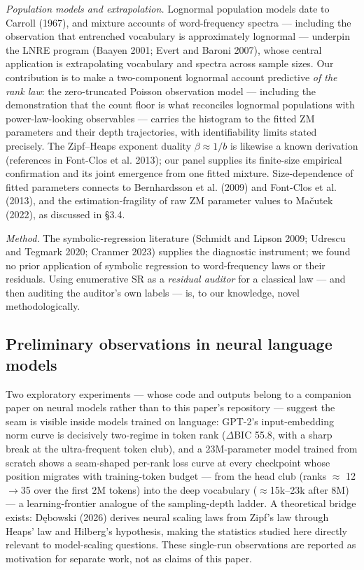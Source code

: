 \documentclass[11pt]{article}
\begin{document}
\emph{Population models and extrapolation.} Lognormal population models date to Carroll (1967), and mixture accounts of word-frequency spectra --- including the observation that entrenched vocabulary is approximately lognormal --- underpin the LNRE program (Baayen 2001; Evert and Baroni 2007), whose central application is extrapolating vocabulary and spectra across sample sizes. Our contribution is to make a two-component lognormal account predictive \emph{of the rank law}: the zero-truncated Poisson observation model --- including the demonstration that the count floor is what reconciles lognormal populations with power-law-looking observables --- carries the histogram to the fitted ZM parameters and their depth trajectories, with identifiability limits stated precisely. The Zipf--Heaps exponent duality $\beta \approx 1/b$ is likewise a known derivation (references in Font-Clos et al. 2013); our panel supplies its finite-size empirical confirmation and its joint emergence from one fitted mixture. Size-dependence of fitted parameters connects to Bernhardsson et al. (2009) and Font-Clos et al. (2013), and the estimation-fragility of raw ZM parameter values to Mačutek (2022), as discussed in \S3.4.

\emph{Method.} The symbolic-regression literature (Schmidt and Lipson 2009; Udrescu and Tegmark 2020; Cranmer 2023) supplies the diagnostic instrument; we found no prior application of symbolic regression to word-frequency laws or their residuals. Using enumerative SR as a \emph{residual auditor} for a classical law --- and then auditing the auditor's own labels --- is, to our knowledge, novel methodologically.

\subsection{Preliminary observations in neural language models}
Two exploratory experiments --- whose code and outputs belong to a companion paper on neural models rather than to this paper's repository --- suggest the seam is visible inside models trained on language: GPT-2's input-embedding norm curve is decisively two-regime in token rank ($\Delta$BIC 55.8, with a sharp break at the ultra-frequent token club), and a 23M-parameter model trained from scratch shows a seam-shaped per-rank loss curve at every checkpoint whose position migrates with training-token budget --- from the head club (ranks $\approx$ 12$\to$35 over the first 2M tokens) into the deep vocabulary ($\approx$15k--23k after 8M) --- a learning-frontier analogue of the sampling-depth ladder. A theoretical bridge exists: Dębowski (2026) derives neural scaling laws from Zipf's law through Heaps' law and Hilberg's hypothesis, making the statistics studied here directly relevant to model-scaling questions. These single-run observations are reported as motivation for separate work, not as claims of this paper.
\end{document}
